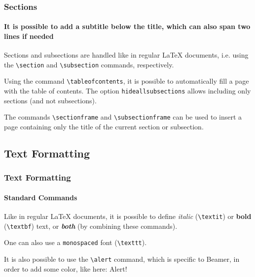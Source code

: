 \documentclass[10pt,    %
    english,            %
    xcolor=table,       %
    envcountsect,       %
    aspectratio=43      %
]{beamer}
\begin{document}
\begin{frame}
    \frametitle{Sections} 
    \framesubtitle{It is possible to add a subtitle below the title, which can also span two lines if needed}
    
    Sections and subsections are handled like in regular \LaTeX{} documents, i.e. using the \texttt{\textbackslash{}section} and \texttt{\textbackslash{}subsection} commands, respectively.
    
    \medskip
    Using the command \texttt{\textbackslash{}tableofcontents}, it is possible to automatically fill a page with the table of contents. The option \texttt{hideallsubsections} allows including only sections (and not subsections).
    
    \medskip
    The commands \texttt{\textbackslash{}sectionframe} and \texttt{\textbackslash{}subsectionframe} can be used to insert a page containing only the title of the current section or subsection.
\end{frame}




\subsection{Text Formatting}
\label{sec:TextFormatting}

\begin{frame}
    \frametitle{Text Formatting} 
    \framesubtitle{Standard Commands} 
    
    Like in regular \LaTeX{} documents, it is possible to define \textit{italic} (\texttt{\textbackslash{}textit}) or \textbf{bold} (\texttt{\textbackslash{}textbf}) text, or \textit{\textbf{both}} (by combining these commands). 
    
    \medskip
    One can also use a \texttt{monospaced} font (\texttt{\textbackslash{}texttt}).
    
    \medskip
    It is also possible to use the \texttt{\textbackslash{}alert} command, which is specific to Beamer, in order to add some color, like here: \alert{Alert!}
    
    
\end{frame}
    
\end{document}
